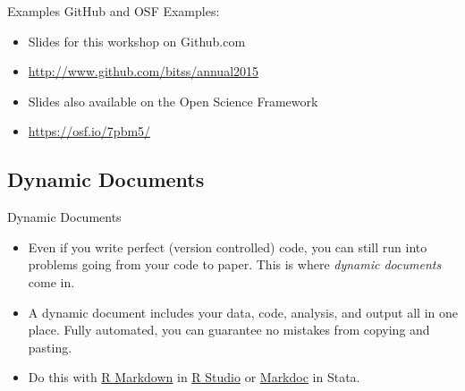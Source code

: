 \documentclass{beamer}
\begin{document}
{    \begin{frame}[plain]
     \end{frame}
}
\begin{frame}{Examples}
GitHub and OSF Examples:
\begin{itemize}
\item
Slides for this workshop on Github.com
\item \url{http://www.github.com/bitss/annual2015}
\item
Slides also available on the Open Science Framework
 \item \url{https://osf.io/7pbm5/}
\end{itemize}
\end{frame}
\subsection{Dynamic Documents}
\begin{frame}{Dynamic Documents}
\begin{itemize}[<+->]
\item
Even if you write perfect (version controlled) code, you can still run into problems going from your code to paper. This is where \textit{dynamic documents} come in.
\item
A dynamic document includes your data, code, analysis, and output all in one place. Fully automated, you can guarantee no mistakes from copying and pasting.
\item
Do this with \href{http://rmarkdown.rstudio.com/}{R Markdown} in \href{https://www.rstudio.com/}{R Studio} or 
\href{http://www.haghish.com/statistics/stata-blog/reproducible-research/markdoc.php}{Markdoc} in Stata.
\end{itemize}
\end{frame}
\end{document}
